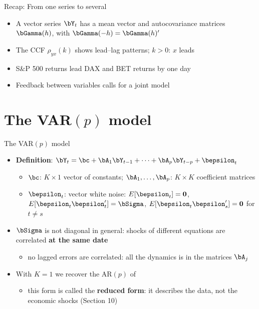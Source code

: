 \begin{frame}{Recap: From one series to several}
\itemsize{\small}
\begin{itemize}
    \item A vector series $\bY_t$ has a mean vector and autocovariance matrices $\bGamma(h)$, with $\bGamma(-h) = \bGamma(h)'$
    \item The CCF $\rho_{yx}(k)$ shows lead--lag patterns; $k > 0$: $x$ leads
    \item S\&P 500 returns lead DAX and BET returns by one day
    \item Feedback between variables calls for a joint model
\end{itemize}
\end{frame}


\section{The VAR$(p)$ model}

\begin{frame}{The VAR$(p)$ model}
\itemsize{\small}
\begin{itemize}
    \item \textbf{Definition}: $\bY_t = \bc + \bA_1\bY_{t-1} + \dots + \bA_p\bY_{t-p} + \bepsilon_t$
    \begin{itemize}
        \item $\bc$: $K \times 1$ vector of constants; $\bA_1, \dots, \bA_p$: $K \times K$ coefficient matrices
        \item $\bepsilon_t$: vector white noise: $E[\bepsilon_t] = \mathbf{0}$, $E[\bepsilon_t\bepsilon_t'] = \bSigma$, $E[\bepsilon_t\bepsilon_s'] = \mathbf{0}$ for $t \ne s$
    \end{itemize}
    \item $\bSigma$ is not diagonal in general: shocks of different equations are correlated \textbf{at the same date}
    \begin{itemize}
        \item no lagged errors are correlated: all the dynamics is in the matrices $\bA_j$
    \end{itemize}
    \item With $K = 1$ we recover the AR$(p)$ of 
    \begin{itemize}
        \item this form is called the \textbf{reduced form}: it describes the data, not the economic shocks (Section 10)
    \end{itemize}
\end{itemize}
\end{frame}

